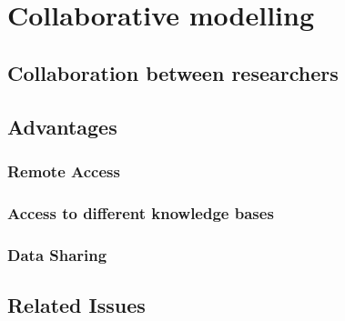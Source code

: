 \chapter{Collaborative modelling}
\label{chap-four}
\section{Collaboration between researchers}

\section{Advantages}

\subsection{Remote Access}

\subsection{Access to different knowledge bases}

\subsection{Data Sharing}

\section {Related Issues}